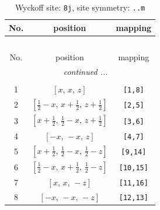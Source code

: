 \documentclass[fleqn,8pt]{jsarticle}
\begin{document}
\begin{longtable}{ccc}
\caption{Wyckoff site: {\tt 8j}, site symmetry: {\tt ..m}}
 \\
 \hline \hline
No. & position & mapping \\ \hline \endfirsthead

\multicolumn{2}{l}{\tablename\ \thetable{}} \\
 \hline \hline
No. & position & mapping \\ \hline \endhead

 \hline \hline
\multicolumn{2}{r}{\footnotesize\it continued ...} \\ \endfoot

 \hline \hline
\multicolumn{2}{r}{} \\ \endlastfoot

1 & $\left[ x,\, x,\, z \right]$ & {\tt [1,8]} \\ \hline
2 & $\left[ \frac{1}{2} - x,\, x + \frac{1}{2},\, z + \frac{1}{2} \right]$ & {\tt [2,5]} \\ \hline
3 & $\left[ x + \frac{1}{2},\, \frac{1}{2} - x,\, z + \frac{1}{2} \right]$ & {\tt [3,6]} \\ \hline
4 & $\left[ - x,\, - x,\, z \right]$ & {\tt [4,7]} \\ \hline
5 & $\left[ x + \frac{1}{2},\, \frac{1}{2} - x,\, \frac{1}{2} - z \right]$ & {\tt [9,14]} \\ \hline
6 & $\left[ \frac{1}{2} - x,\, x + \frac{1}{2},\, \frac{1}{2} - z \right]$ & {\tt [10,15]} \\ \hline
7 & $\left[ x,\, x,\, - z \right]$ & {\tt [11,16]} \\ \hline
8 & $\left[ - x,\, - x,\, - z \right]$ & {\tt [12,13]} \\
\end{longtable}
\renewcommand{\arraystretch}{1.2}
\end{document}
